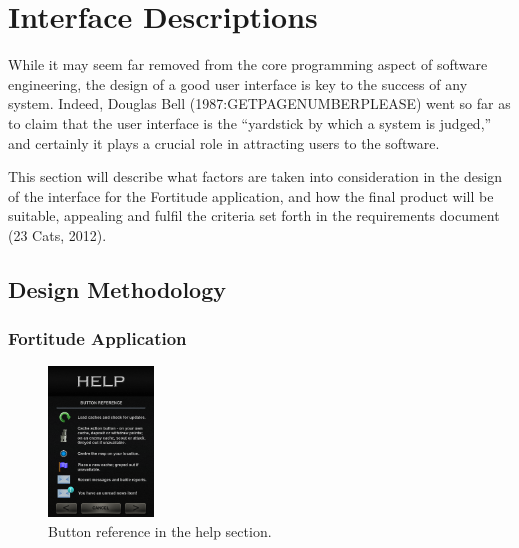 \section{Interface Descriptions}

While it may seem far removed from the core programming aspect of software engineering, the design of a good user interface is key to the success of any system. Indeed, Douglas Bell (1987:GETPAGENUMBERPLEASE) went so far as to claim that the user interface is the “yardstick by which a system is judged,” and certainly it plays a crucial role in attracting users to the software.

This section will describe what factors are taken into consideration in the design of the interface for the Fortitude application, and how the final product will be suitable, appealing and fulfil the criteria set forth in the requirements document (23 Cats, 2012).
\vspace{-10pt}
\subsection{Design Methodology}
\subsubsection{Fortitude Application}

\begin{figure}
	\vspace{-20pt}
	\begin{center}
	\includegraphics[width=0.25\textwidth]{images/help_mockup}
	\caption{Button reference in the help section.}
	\label{help_mockup}
	\end{center}
	\vspace{40pt}
\end{figure}

